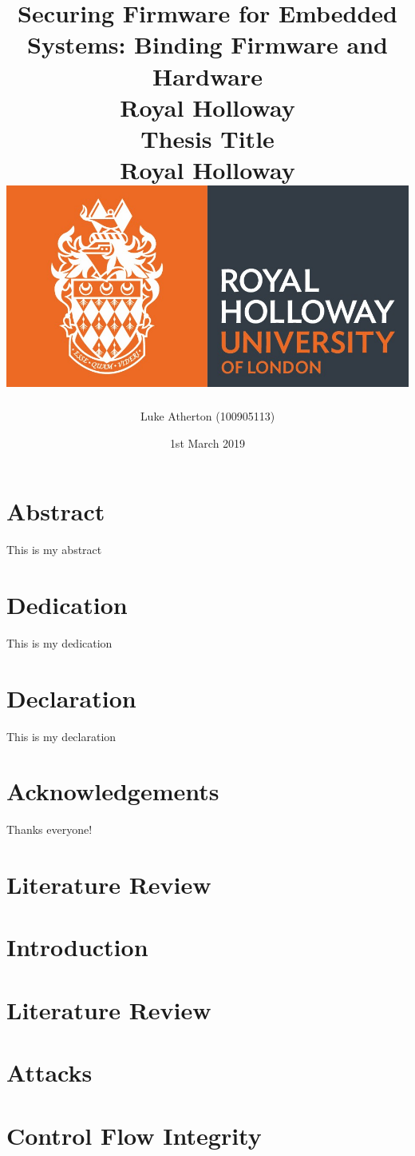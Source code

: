 \documentclass[10pt]{report}
\title{
	{Securing Firmware for Embedded Systems: Binding Firmware and Hardware}\\
	{\large Royal Holloway}\\
}
\title{
	{Thesis Title}\\
	{\large Royal Holloway}\\
	{\includegraphics[scale=0.5]{royalholloway.jpg}}
}
\author{Luke Atherton (100905113)}
\date{1st March 2019}
\newif\iflitreview
\begin{document}
\maketitle

\iflitreview

\else

\chapter*{Abstract}
This is my abstract

\chapter*{Dedication}
This is my dedication

\chapter*{Declaration}
This is my declaration

\chapter*{Acknowledgements}
Thanks everyone!

\fi

\tableofcontents

\iflitreview

\chapter{Literature Review}

\else

\chapter{Introduction}


\chapter{Literature Review}


\chapter{Attacks}


\chapter{Control Flow Integrity}

\end{document}
